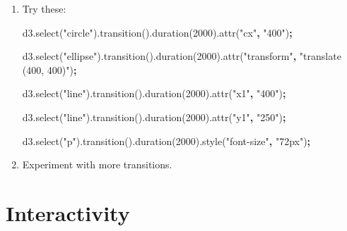 \documentclass[]{book}
\newenvironment{Shaded}{\begin{snugshade}}{\end{snugshade}}
\newcommand{\AttributeTok}[1]{\textcolor[rgb]{0.77,0.63,0.00}{#1}}
\newcommand{\DecValTok}[1]{\textcolor[rgb]{0.00,0.00,0.81}{#1}}
\newcommand{\NormalTok}[1]{#1}
\newcommand{\OperatorTok}[1]{\textcolor[rgb]{0.81,0.36,0.00}{\textbf{#1}}}
\newcommand{\StringTok}[1]{\textcolor[rgb]{0.31,0.60,0.02}{#1}}
\newcommand{\VariableTok}[1]{\textcolor[rgb]{0.00,0.00,0.00}{#1}}
\begin{document}
\begin{enumerate}
\def\labelenumi{\arabic{enumi}.}
\item
  Try these:

\begin{Shaded}
\begin{Highlighting}[]
\VariableTok{d3}\NormalTok{.}\AttributeTok{select}\NormalTok{(}\StringTok{"circle"}\NormalTok{).}\AttributeTok{transition}\NormalTok{().}\AttributeTok{duration}\NormalTok{(}\DecValTok{2000}\NormalTok{).}\AttributeTok{attr}\NormalTok{(}\StringTok{"cx"}\OperatorTok{,} \StringTok{"400"}\NormalTok{)}\OperatorTok{;}

\VariableTok{d3}\NormalTok{.}\AttributeTok{select}\NormalTok{(}\StringTok{"ellipse"}\NormalTok{).}\AttributeTok{transition}\NormalTok{().}\AttributeTok{duration}\NormalTok{(}\DecValTok{2000}\NormalTok{).}\AttributeTok{attr}\NormalTok{(}\StringTok{"transform"}\OperatorTok{,} \StringTok{"translate (400, 400)"}\NormalTok{)}\OperatorTok{;}

\VariableTok{d3}\NormalTok{.}\AttributeTok{select}\NormalTok{(}\StringTok{"line"}\NormalTok{).}\AttributeTok{transition}\NormalTok{().}\AttributeTok{duration}\NormalTok{(}\DecValTok{2000}\NormalTok{).}\AttributeTok{attr}\NormalTok{(}\StringTok{"x1"}\OperatorTok{,} \StringTok{"400"}\NormalTok{)}\OperatorTok{;}

\VariableTok{d3}\NormalTok{.}\AttributeTok{select}\NormalTok{(}\StringTok{"line"}\NormalTok{).}\AttributeTok{transition}\NormalTok{().}\AttributeTok{duration}\NormalTok{(}\DecValTok{2000}\NormalTok{).}\AttributeTok{attr}\NormalTok{(}\StringTok{"y1"}\OperatorTok{,} \StringTok{"250"}\NormalTok{)}\OperatorTok{;}

\VariableTok{d3}\NormalTok{.}\AttributeTok{select}\NormalTok{(}\StringTok{"p"}\NormalTok{).}\AttributeTok{transition}\NormalTok{().}\AttributeTok{duration}\NormalTok{(}\DecValTok{2000}\NormalTok{).}\AttributeTok{style}\NormalTok{(}\StringTok{"font-size"}\OperatorTok{,} \StringTok{"72px"}\NormalTok{)}\OperatorTok{;}
\end{Highlighting}
\end{Shaded}
\item
  Experiment with more transitions.
\end{enumerate}

\hypertarget{interactivity}{%
\section{Interactivity}\label{interactivity}}
\end{document}
